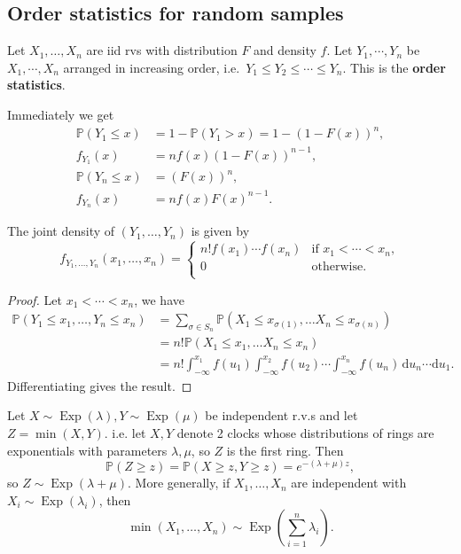 \subsection{Order statistics for random samples}
\begin{definition}
    Let $ X_1,\dots,X_n $ are iid rvs with distribution $ F $ and density $f$. Let $Y_1, \cdots, Y_n$ be $X_1, \cdots, X_n$ arranged in increasing order, i.e.\ $Y_1 \le Y_2 \le \cdots \le Y_n$. This is the \textbf{order statistics}.
\end{definition}
Immediately we get 
\begin{align*}
    \mathbb P(Y_1\le x)&=1-\mathbb P(Y_1>x)=1-(1-F(x))^n,\\ 
    f_{Y_1}(x)&= nf(x)(1-F(x))^{n-1},\\
    \mathbb P(Y_n\le x)&=(F(x))^n,\\ 
    f_{Y_n}(x)&=nf(x)F(x)^{n-1}.
\end{align*}
\begin{proposition}
    The joint density of $(Y_1,\ldots,Y_n)$ is given by 
    \[
        f_{Y_1,\dots,Y_n}(x_1,\ldots,x_n) = \begin{cases}
            n!f(x_1)\cdots f(x_n) &\text{if } x_1<\cdots<x_n,\\
         0&\text{otherwise}.\\
        \end{cases} 
    \]
\end{proposition}
\begin{proof}
    Let $x_1<\cdots<x_n$, we have
    \begin{align*}
        \mathbb P(Y_1\le x_1,\ldots,Y_n\le x_n)&=\sum_{\sigma\in S_n}\mathbb P(X_1\le x_{\sigma(1)},\ldots X_n\le x_{\sigma(n)})\\
        &=n!\mathbb P(X_1\le x_1,\ldots X_n\le x_n)\\
        &=n!\int_{-\infty}^{x_1}f(u_1)\int_{-\infty}^{x_2}f(u_2)\cdots\int_{-\infty}^{x_n}f(u_n)\,\mathrm du_n\cdots\mathrm  du_1.
    \end{align*}
    Differentiating gives the result.
\end{proof}
\begin{example}
    Let $ X \sim \operatorname{Exp}(\lambda),Y \sim \operatorname{Exp}(\mu) $ be independent r.v.s and let $ Z=\min (X,Y) $. i.e. let $X,Y$ denote 2 clocks whose distributions of rings are exponentials with parameters $ \lambda,\mu $, so $Z$ is the first ring. Then 
    \[
        \mathbb{P}(Z\ge z) = \mathbb{P}(X\ge z,Y\ge z) = e^{-(\lambda+\mu)z},
    \]
    so $ Z \sim \operatorname{Exp} (\lambda+\mu) $. More generally, if $ X_1,\dots,X_n $ are independent with $ X_i \sim \operatorname{Exp}(\lambda_i) $, then 
    \[
        \min (X_1,\dots,X_n) \sim \operatorname{Exp}\left( \sum_{i=1}^{n}\lambda_i \right).
    \]
\end{example}
